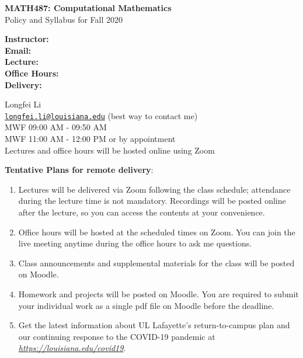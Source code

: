 \documentclass[11pt]{article}
\begin{document}
\begin{center}
  {\bf\Large MATH487: Computational Mathematics} \\
  Policy and Syllabus for Fall 2020\\
  \end{center}
\begin{minipage}[t]{0.2\linewidth}
{\bf Instructor:}\\  
{\bf Email:}\\  
{\bf Lecture:} \\
{\bf Office Hours:}\\
{\bf Delivery:}\\
\end{minipage}
\begin{minipage}[t]{0.8\linewidth}
Longfei Li\\
\href{mailto:longfei.li@louisiana.edu}{\tt longfei.li@louisiana.edu}  (best way to contact me)\\
MWF 09:00 AM - 09:50 AM\\
MWF 11:00 AM - 12:00 PM or by appointment\\
Lectures and office hours will be hosted online using Zoom\\
\end{minipage}


{\bf Tentative Plans for remote delivery}:
\begin{enumerate}[noitemsep,leftmargin=0.55cm]
\item  Lectures will be delivered via Zoom following the class schedule; attendance during the lecture time is not mandatory. Recordings will be posted online after the lecture, so you can access the contents at your convenience.
\item Office hours will be hosted at the scheduled times on Zoom. You can join the live meeting anytime during the office hours to ask me questions. 
\item Class announcements and supplemental materials for the class will be posted on Moodle.
\item Homework and projects will be posted on Moodle. You are required to submit your individual work as a single pdf file on Moodle before the deadline. 
\item Get the latest information about UL Lafayette's return-to-campus plan and our continuing response to the COVID-19 pandemic at \href{https://louisiana.edu/covid19}{\em https://louisiana.edu/covid19}.\\
\end{enumerate}
\end{document}

